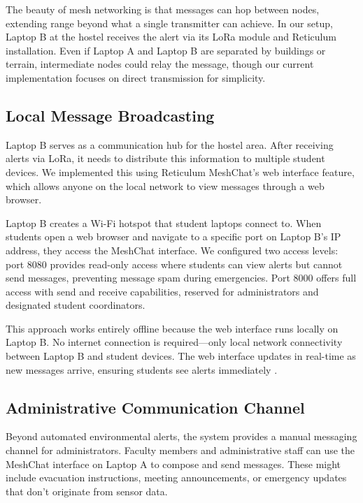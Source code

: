 The beauty of mesh networking is that messages can hop between nodes, extending range beyond what a single transmitter can achieve. In our setup, Laptop B at the hostel receives the alert via its LoRa module and Reticulum installation. Even if Laptop A and Laptop B are separated by buildings or terrain, intermediate nodes could relay the message, though our current implementation focuses on direct transmission for simplicity.

\subsection{Local Message Broadcasting}

Laptop B serves as a communication hub for the hostel area. After receiving alerts via LoRa, it needs to distribute this information to multiple student devices. We implemented this using Reticulum MeshChat's web interface feature, which allows anyone on the local network to view messages through a web browser.

Laptop B creates a Wi-Fi hotspot that student laptops connect to. When students open a web browser and navigate to a specific port on Laptop B's IP address, they access the MeshChat interface. We configured two access levels: port 8080 provides read-only access where students can view alerts but cannot send messages, preventing message spam during emergencies. Port 8000 offers full access with send and receive capabilities, reserved for administrators and designated student coordinators.

This approach works entirely offline because the web interface runs locally on Laptop B. No internet connection is required—only local network connectivity between Laptop B and student devices. The web interface updates in real-time as new messages arrive, ensuring students see alerts immediately \cite{reticulum2023documentation}.

\subsection{Administrative Communication Channel}

Beyond automated environmental alerts, the system provides a manual messaging channel for administrators. Faculty members and administrative staff can use the MeshChat interface on Laptop A to compose and send messages. These might include evacuation instructions, meeting announcements, or emergency updates that don't originate from sensor data.

